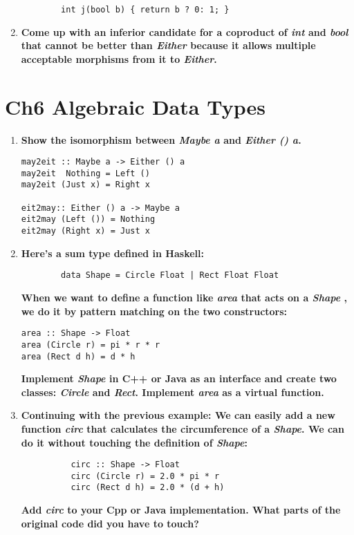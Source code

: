 \documentclass{article}
\begin{document}
\begin{enumerate}
\begin{verbatim}
		int j(bool b) { return b ? 0: 1; }
		\end{verbatim}
	\item \textbf{Come up with an inferior candidate for a coproduct of \textit{int} and \textit{bool} that cannot be better than \textit{Either} because it allows multiple acceptable morphisms from it to \textit{Either}.}
\end{enumerate}

\section{Ch6 Algebraic Data Types}

\begin{enumerate}
	\item \textbf{Show the isomorphism between \textit{Maybe a} and \textit{Either () a}.}

	      \begin{verbatim}
may2eit :: Maybe a -> Either () a
may2eit  Nothing = Left ()
may2eit (Just x) = Right x

eit2may:: Either () a -> Maybe a
eit2may (Left ()) = Nothing
eit2may (Right x) = Just x
\end{verbatim}

	\item \textbf{Here's a sum type defined in Haskell:}

	      \begin{verbatim}
		data Shape = Circle Float | Rect Float Float
		\end{verbatim}
	      \textbf{When we want to define a function like \textit{area} that acts on a \textit{Shape} , we do it by pattern matching on the two constructors: }
	      \begin{verbatim}
area :: Shape -> Float 
area (Circle r) = pi * r * r
area (Rect d h) = d * h
\end{verbatim}
	      \textbf{Implement \textit{Shape} in C++ or Java as an interface and create two classes: \textit{Circle} and \textit{Rect}. Implement \textit{area} as a virtual function.}

	\item \textbf{Continuing with the previous example: We can easily add a new function \textit{circ} that calculates the circumference of a \textit{Shape}. We can do it without touching the definition of \textit{Shape}:  }
	      \begin{verbatim}
	      circ :: Shape -> Float
	      circ (Circle r) = 2.0 * pi * r
	      circ (Rect d h) = 2.0 * (d + h)
	      \end{verbatim}
	      \textbf{Add \textit{circ} to your Cpp or Java implementation. What parts of the original code did you have to touch?}



\end{enumerate}
\end{document}
